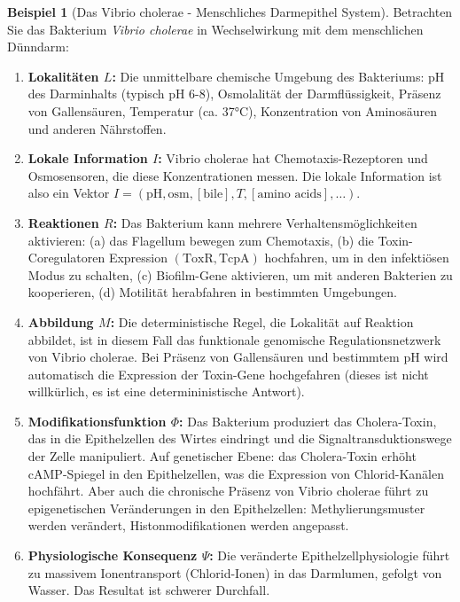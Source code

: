 \documentclass[a4paper,12pt]{article}
\theoremstyle{definition}
\newtheorem{beispiel}{Beispiel}
\begin{document}
\begin{beispiel}[Das Vibrio cholerae - Menschliches Darmepithel System]
Betrachten Sie das Bakterium \textit{Vibrio cholerae} in Wechselwirkung mit dem menschlichen Dünndarm:

\begin{enumerate}
    \item \textbf{Lokalitäten $L$:} Die unmittelbare chemische Umgebung des Bakteriums: pH des Darminhalts (typisch pH 6-8), Osmolalität der Darmflüssigkeit, Präsenz von Gallensäuren, Temperatur (ca. 37°C), Konzentration von Aminosäuren und anderen Nährstoffen.
    
    \item \textbf{Lokale Information $I$:} Vibrio cholerae hat Chemotaxis-Rezeptoren und Osmosensoren, die diese Konzentrationen messen. Die lokale Information ist also ein Vektor $I = (\text{pH}, \text{osm}, [\text{bile}], T, [\text{amino acids}], \ldots)$.
    
    \item \textbf{Reaktionen $R$:} Das Bakterium kann mehrere Verhaltensmöglichkeiten aktivieren: (a) das Flagellum bewegen zum Chemotaxis, (b) die Toxin-Coregulatoren Expression $(\text{ToxR}, \text{TcpA})$ hochfahren, um in den infektiösen Modus zu schalten, (c) Biofilm-Gene aktivieren, um mit anderen Bakterien zu kooperieren, (d) Motilität herabfahren in bestimmten Umgebungen.
    
    \item \textbf{Abbildung $M$:} Die deterministische Regel, die Lokalität auf Reaktion abbildet, ist in diesem Fall das funktionale genomische Regulationsnetzwerk von Vibrio cholerae. Bei Präsenz von Gallensäuren und bestimmtem pH wird automatisch die Expression der Toxin-Gene hochgefahren (dieses ist nicht willkürlich, es ist eine determininistische Antwort).
    
    \item \textbf{Modifikationsfunktion $\Phi$:} Das Bakterium produziert das Cholera-Toxin, das in die Epithelzellen des Wirtes eindringt und die Signaltransduktionswege der Zelle manipuliert. Auf genetischer Ebene: das Cholera-Toxin erhöht cAMP-Spiegel in den Epithelzellen, was die Expression von Chlorid-Kanälen hochfährt. Aber auch die chronische Präsenz von Vibrio cholerae führt zu epigenetischen Veränderungen in den Epithelzellen: Methylierungsmuster werden verändert, Histonmodifikationen werden angepasst.
    
    \item \textbf{Physiologische Konsequenz $\Psi$:} Die veränderte Epithelzellphysiologie führt zu massivem Ionentransport (Chlorid-Ionen) in das Darmlumen, gefolgt von Wasser. Das Resultat ist schwerer Durchfall.
    

\end{enumerate}
\end{beispiel}
\end{document}
